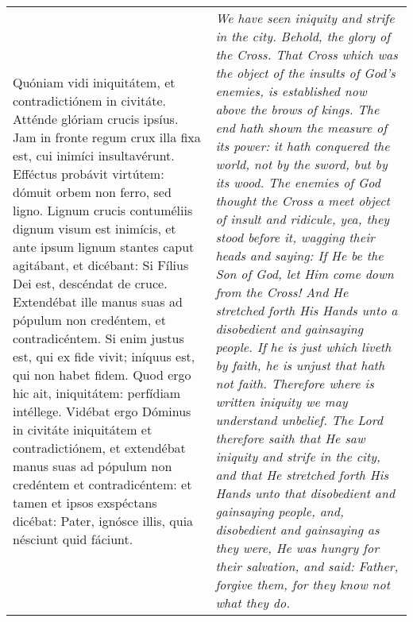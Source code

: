 \begin{tabular}{p{8cm} | p{8cm}}
Quóniam vidi iniquitátem, et contradictiónem in civitáte. Atténde glóriam crucis ipsíus. Jam in fronte regum crux illa fixa est, cui inimíci insultavérunt. Efféctus probávit virtútem: dómuit orbem non ferro, sed ligno. Lignum crucis contuméliis dignum visum est inimícis, et ante ipsum lignum stantes caput agitábant, et dicébant: Si Fílius Dei est, descéndat de cruce. Extendébat ille manus suas ad pópulum non credéntem, et contradicéntem. Si enim justus est, qui ex fide vivit; iníquus est, qui non habet fidem. Quod ergo hic ait, iniquitátem: perfídiam intéllege. Vidébat ergo Dóminus in civitáte iniquitátem et contradictiónem, et extendébat manus suas ad pópulum non credéntem et contradicéntem: et tamen et ipsos exspéctans dicébat: Pater, ignósce illis, quia nésciunt quid fáciunt.
& \textit{We have seen iniquity and strife in the city. Behold, the glory of the Cross. That Cross which was the object of the insults of God's enemies, is established now above the brows of kings. The end hath shown the measure of its power: it hath conquered the world, not by the sword, but by its wood. The enemies of God thought the Cross a meet object of insult and ridicule, yea, they stood before it, wagging their heads and saying: If He be the Son of God, let Him come down from the Cross! And He stretched forth His Hands unto a disobedient and gainsaying people. If he is just which liveth by faith, he is unjust that hath not faith. Therefore where is written iniquity we may understand unbelief. The Lord therefore saith that He saw iniquity and strife in the city, and that He stretched forth His Hands unto that disobedient and gainsaying people, and, disobedient and gainsaying as they were, He was hungry for their salvation, and said: Father, forgive them, for they know not what they do.}
\end{tabular}